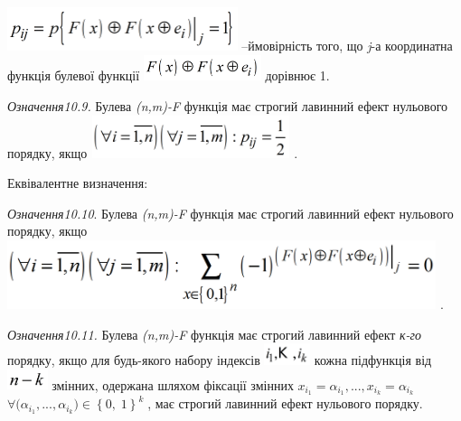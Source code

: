 \documentclass[a4paper]{article}
\newcounter{}
\begin{document}
 \includegraphics[width=2.6528in,height=0.498in]{crypt-img/crypt-img229.png}
\textit{ }–ймовірність того, що \textit{j}{}-а координатна функція булевої
функції 
\includegraphics[width=1.3555in,height=0.3028in]{crypt-img/crypt-img230.png} 
дорівнює  1.

\textit{ Означення10.9.} Булева 
\textit{(}\textit{n}\textit{,}\textit{m}\textit{)-}\textit{F}  функція має
строгий лавинний ефект нульового порядку, якщо 
\includegraphics[width=2.2874in,height=0.4882in]{crypt-img/crypt-img231.png} .

Еквівалентне визначення:

 \textit{Означення10.10}. Булева
\textit{(}\textit{n}\textit{,}\textit{m}\textit{)-}\textit{F} функція має
строгий лавинний ефект нульового порядку, якщо 
\includegraphics[width=4.9409in,height=0.7929in]{crypt-img/crypt-img232.png} .

\textit{ Означення10.11.} Булева
\textit{(}\textit{n}\textit{,}\textit{m}\textit{)-}\textit{F}  функція має
строгий лавинний ефект \textit{к-го }порядку, якщо для будь-якого набору
індексів 
\includegraphics[width=0.528in,height=0.25in]{crypt-img/crypt-img233.png} 
кожна підфункція від 
\includegraphics[width=0.4638in,height=0.2374in]{crypt-img/crypt-img234.png} 
змінних, одержана шляхом фіксації змінних  ${x_{{i_{{1}}}}=\alpha
_{i_{{1}}}{,\text{.}\text{.}\text{.},x_{i_{{k}}}}{=\alpha _{i_{{k}}}}}$ 
${\forall (\alpha _{{i_{{1}}}},\text{.}\text{.}\text{.},\alpha _{i_{{k}}}{)\in
\left\{0,\;1\right\}^{k}}{\;}}$, має строгий лавинний ефект нульового порядку. 
\end{document}

